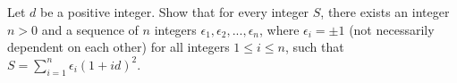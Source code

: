 Let $d$ be a positive integer. Show that for every integer $S$,  there exists an integer $n>0$ and a sequence of $n$ integers $\epsilon_1, \epsilon_2,..., \epsilon_n$,  where $\epsilon_i = \pm 1$ (not necessarily dependent on each other) for all integers $1\le i\le n$,  such that $S=\sum_{i=1}^{n}{\epsilon_i(1+id)^2}$.